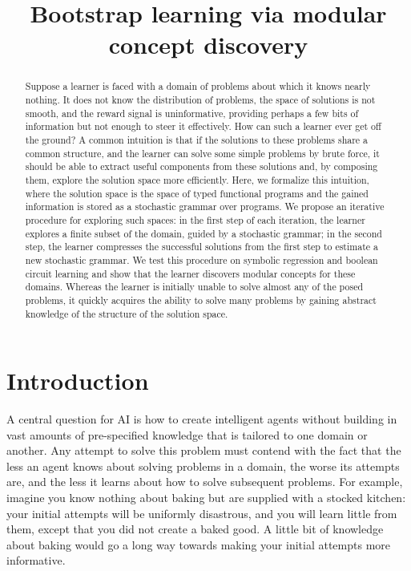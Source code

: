 \documentclass{article}
\date{}
\title{Bootstrap learning via modular concept discovery}
\begin{document}
\maketitle
\begin{abstract}
 Suppose a learner is faced with a domain of problems about which it
 knows nearly nothing. It does not know the distribution of problems,
 the space of solutions is not smooth, and the reward signal is
 uninformative, providing perhaps a few bits of information but not
 enough to steer it effectively. How can such a learner ever get off
 the ground? A common intuition is that if the solutions to these
 problems share a common structure, and the learner can solve some
 simple problems by brute force, it should be able to extract useful
 components from these solutions and, by composing them, explore the
 solution space more efficiently. Here, we formalize this intuition,
 where the solution space is the space of typed functional programs
 and the gained information is stored as a stochastic grammar over
 programs. We propose an iterative procedure for exploring such
 spaces: in the first step of each iteration, the learner explores a
 finite subset of the domain, guided by a stochastic grammar; in the
 second step, the learner compresses the successful solutions from the
 first step to estimate a new stochastic grammar. We test this
 procedure on symbolic regression and boolean circuit learning and
 show that the learner discovers modular concepts for these
 domains. Whereas the learner is initially unable to solve almost any
 of the posed problems, it quickly acquires the ability to solve many
 problems by gaining abstract knowledge of the structure of the
 solution space.
 
\end{abstract}

\section{Introduction}
A central question for AI is how to create intelligent agents without
building in vast amounts of pre-specified knowledge that is tailored
to one domain or another. Any attempt to solve this problem must
contend with the fact that the less an agent knows about solving
problems in a domain, the worse its attempts are, and the less it
learns about how to solve subsequent problems. For example, imagine
you know nothing about baking but are supplied with a stocked kitchen:
your initial attempts will be uniformly disastrous, and you will learn
little from them, except that you did not create a baked good. A
little bit of knowledge about baking would go a long way towards
making your initial attempts more informative. 
\end{document}
